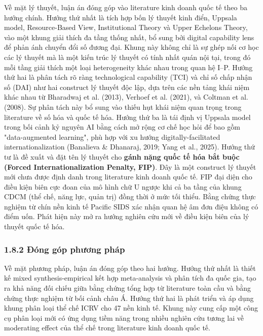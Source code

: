\documentclass[12pt,a4paper]{article}
\begin{document}
Về mặt lý thuyết, luận án đóng góp vào literature kinh doanh quốc tế
theo ba hướng chính. Hướng thứ nhất là tích hợp bốn lý thuyết kinh điển,
Uppsala model, Resource-Based View, Institutional Theory và Upper
Echelons Theory, vào một khung giải thích đa tầng thống nhất, bổ sung
bởi digital capability lens để phản ánh chuyển đổi số đương đại. Khung
này không chỉ là sự ghép nối cơ học các lý thuyết mà là một kiến trúc lý
thuyết có tính nhất quán nội tại, trong đó mỗi tầng giải thích một loại
heterogeneity khác nhau trong quan hệ I--P. Hướng thứ hai là phân tách
rõ ràng technological capability (TCI) và chỉ số chấp nhận số (DAI) như
hai construct lý thuyết độc lập, dựa trên các nền tảng khái niệm khác
nhau từ Bharadwaj et al. (2013), Verhoef et al. (2021), và Coltman et
al. (2008). Sự phân tách này bổ sung vào thiếu hụt khái niệm quan trọng
trong literature về số hóa và quốc tế hóa. Hướng thứ ba là tái định vị
Uppsala model trong bối cảnh kỷ nguyên AI bằng cách mở rộng cơ chế học
hỏi để bao gồm "data-augmented learning", phù hợp với xu hướng
digitally-facilitated internationalization (Banalieva \& Dhanaraj, 2019;
Yang et al., 2025). Hướng thứ tư là đề xuất và đặt tên lý thuyết cho
\textbf{gánh nặng quốc tế hóa bắt buộc (Forced Internationalization
Penalty, FIP)}. Đây là một construct lý thuyết mới chưa được định danh
trong literature kinh doanh quốc tế. FIP đại diện cho điều kiện biên cực
đoan của mô hình chữ U ngược khi cả ba tầng của khung CDCM (thể chế,
năng lực, quản trị) đồng thời ở mức tối thiểu. Bằng chứng thực nghiệm từ
chín nền kinh tế Pacific SIDS xác nhận quan hệ âm đơn điệu không có điểm
uốn. Phát hiện này mở ra hướng nghiên cứu mới về điều kiện biên của lý
thuyết quốc tế hóa.

\hypertarget{182-ux111uxf3ng-guxf3p-phux1b0ux1a1ng-phuxe1p}{%
\subsubsection{1.8.2 Đóng góp phương
pháp}\label{182-ux111uxf3ng-guxf3p-phux1b0ux1a1ng-phuxe1p}}

Về mặt phương pháp, luận án đóng góp theo hai hướng. Hướng thứ nhất là
thiết kế mixed synthesis-empirical kết hợp meta-analysis và phân tích đa
quốc gia, tạo ra khả năng đối chiếu giữa bằng chứng tổng hợp từ
literature toàn cầu và bằng chứng thực nghiệm từ bối cảnh châu Á. Hướng
thứ hai là phát triển và áp dụng khung phân loại thể chế ICRV cho 47 nền
kinh tế. Khung này cung cấp một công cụ phân loại mới có ứng dụng tiềm
năng trong nhiều nghiên cứu tương lai về moderating effect của thể chế
trong literature kinh doanh quốc tế.
\end{document}

